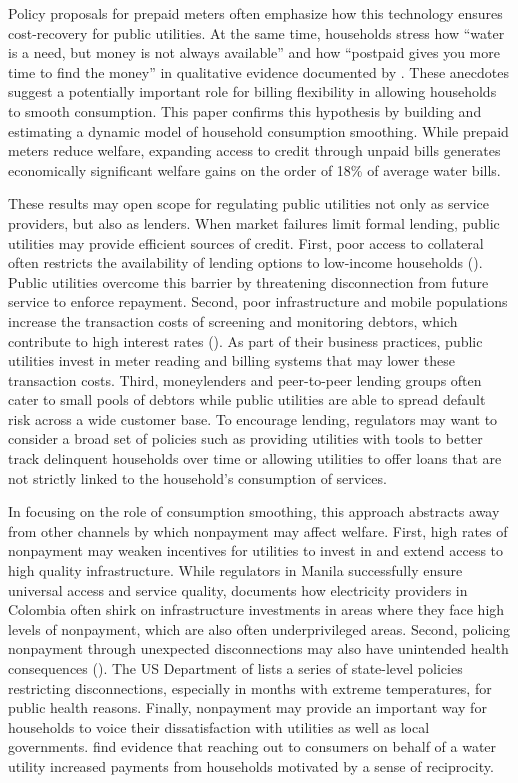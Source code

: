 \documentclass[12pt,table]{article}
\begin{document}
Policy proposals for prepaid meters often emphasize how this technology ensures cost-recovery for public utilities.  At the same time, households stress how ``water is a need, but money is not always available'' and  how ``postpaid gives you more time to find the money'' in qualitative evidence documented by \cite{heymans2014limits}.  These anecdotes suggest a potentially important role for billing flexibility in allowing households to smooth consumption.  This paper confirms this hypothesis by building and estimating a dynamic model of household consumption smoothing.  While prepaid meters reduce welfare, expanding access to credit through unpaid bills generates economically significant welfare gains on the order of 18\% of average water bills.  

These results may open scope for regulating public utilities not only as service providers, but also as lenders.  When market failures limit formal lending, public utilities may provide efficient sources of credit.  First, poor access to collateral often restricts the availability of lending options to low-income households (\cite{jack2016borrowing}).  Public utilities overcome this barrier by threatening disconnection from future service to enforce repayment.  Second, poor infrastructure and mobile populations increase the transaction costs of screening and monitoring debtors, which contribute to high interest rates (\cite{jack2014risk}).  As part of their business practices, public utilities invest in meter reading and billing systems that may lower these transaction costs.  Third, moneylenders and peer-to-peer lending groups often cater to small pools of debtors while public utilities are able to spread default risk across a wide customer base.  To encourage lending, regulators may want to consider a broad set of policies such as providing utilities with tools to better track delinquent households over time or allowing utilities to offer loans that are not strictly linked to the household's consumption of services.  

In focusing on the role of consumption smoothing, this approach abstracts away from other channels by which nonpayment may affect welfare.  First, high rates of nonpayment may weaken incentives for utilities to invest in and extend access to high quality infrastructure.  While regulators in Manila successfully ensure universal access and service quality, \cite{mcrae2015infrastructure} documents how electricity providers in Colombia often shirk on infrastructure investments in areas where they face high levels of nonpayment, which are also often underprivileged areas.  Second, policing nonpayment through unexpected disconnections may also have unintended health consequences (\cite{franklin2017}).  The US Department of \cite{liheap} lists a series of state-level policies restricting disconnections, especially in months with extreme temperatures, for public health reasons.  Finally, nonpayment may provide an important way for households to voice their dissatisfaction with utilities as well as local governments.  \cite{szabo2015reducing} find evidence that reaching out to consumers on behalf of a water utility increased payments from households motivated by a sense of reciprocity.  
\end{document}
